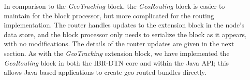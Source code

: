 In comparison to the {\em GeoTracking} block, the {\em GeoRouting} block is easier to maintain for the block processor, but more complicated for the routing implementation. The router handles updates to the extension block in the node's data store, and the block processor only needs to serialize the block as it appears, with no modifications.  The details of the router updates are given in the next section. As with the {\em GeoTracking} extension block, we have implemented the {\em GeoRouting} block in both the IBR-DTN core and within the Java API; this allows Java-based applications to create geo-routed bundles directly.


